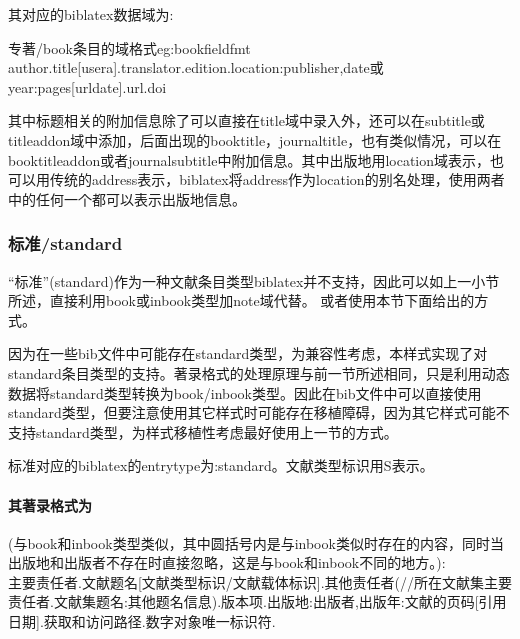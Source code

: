 其对应的biblatex数据域为:
\begin{codetex}{专著/book条目的域格式}{eg:bookfieldfmt}
author.title[usera].translator.edition.location:publisher,date或year:pages[urldate].url.doi
\end{codetex}

其中标题相关的附加信息除了可以直接在title域中录入外，还可以在subtitle或titleaddon域中添加，后面出现的booktitle，journaltitle，也有类似情况，可以在booktitleaddon或者journalsubtitle中附加信息。其中出版地用location域表示，也可以用传统的address表示，biblatex将address作为location的别名处理，使用两者中的任何一个都可以表示出版地信息。


\subsubsection{标准/standard}\label{sec:standard}
“标准”(standard)作为一种文献条目类型biblatex并不支持，因此可以如上一小节所述，直接利用book或inbook类型加note域代替。
或者使用本节下面给出的方式。

因为在一些bib文件中可能存在standard类型，为兼容性考虑，本样式实现了对standard条目类型的支持。著录格式的处理原理与前一节所述相同，只是利用动态数据将standard类型转换为book/inbook类型。因此在bib文件中可以直接使用standard类型，但要注意使用其它样式时可能存在移植障碍，因为其它样式可能不支持standard类型，为样式移植性考虑最好使用上一节的方式。

\begin{refentry}{}{}
标准对应的biblatex的entrytype为:standard。文献类型标识用S表示。

\paragraph{其著录格式为}(与book和inbook类型类似，其中圆括号内是与inbook类似时存在的内容，同时当出版地和出版者不存在时直接忽略，这是与book和inbook不同的地方。):\\
主要责任者.文献题名[文献类型标识/文献载体标识].其他责任者(//所在文献集主要责任者.文献集题名:其他题名信息).版本项.出版地:出版者,出版年:文献的页码[引用日期].获取和访问路径.数字对象唯一标识符.
\end{refentry}

